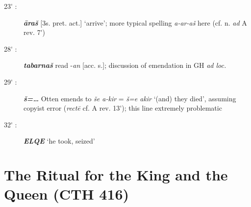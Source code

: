 \documentclass[10pt]{article}
\newcommand{\bit}[1]{\textbf{\textit{#1}}}				%
\newcommand{\p}[1]{{\tiny[{#1}]}}					%
\newcommand{\pr}{\'{ }}									%
\renewcommand{\.}[1]{\textsubdot{#1}}
\begin{document}
\begin{description}
\item[23{\pr} :] \bit{\=ara\v{s}} \p{3s. pret. act.} `arrive'; more typical spelling \textit{a-ar-a\v{s}} here (cf. n. \textit{ad} A rev. 7{\pr})

\item[28{\pr} :] \bit{tabarna\v{s}} read -\textit{an} \p{acc. s.}; discussion of emendation in GH \textit{ad loc.}

\item[29{\pr} :] \bit{\v{s}={\ldots}} Otten \citep[followed by][]{holland2007zalpa} emends to \textit{\v{s}e a-kir} = \textit{\v{s}=e akir} `(and) they died', assuming copyist error (\textit{rect\=e} cf. A rev. 13{\pr}); this line extremely problematic

\item[32{\pr} :] \bit{ELQE} `he took, seized'

\end{description}

\section{The Ritual for the King and the Queen (CTH 416)}
\end{document}
